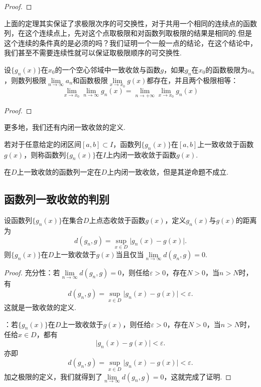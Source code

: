 \begin{proof}
    
\end{proof}

上面的定理其实保证了求极限次序的可交换性，对于共用一个相同的连续点的函数列，在这个连续点上，先对这个点取极限和对函数列取极限的结果是相同的.但是这个连续的条件真的是必须的吗？我们证明一个一般一点的结论，在这个结论中，我们甚至不需要连续性就可以保证取极限顺序的可交换性.

\begin{theorem}\label{thm:函数项级数:连续性定理}
    设\(\{g_n(x)\}\)在\(x_0\)的一个空心邻域中一致收敛与函数\(g\)，如果\(g_n\)在\(x_{0}\)的函数极限为\(a_n\)，则数列极限\(\lim\limits_{n\to\infty}a_n\)和函数极限\(\lim\limits_{x\to x_0}g(x)\)都存在，并且两个极限相等：\[\lim_{x\to x_0}\lim_{n\to \infty}g_{n}(x) = \lim_{n\to +\infty}\lim_{x\to x_0}g_{n}(x)\]
\end{theorem}
\begin{proof}
    
\end{proof}

更多地，我们还有{\heiti 内闭一致收敛}的定义.
\begin{definition}[内闭一致收敛]
    若对于任意给定的闭区间\([a,b]\subset I\)，函数列\(\{g_n(x)\}\)在\([a,b]\)上一致收敛于函数\(g(x)\)，则称函数列\(\{g_n(x)\}\)在\(I\)上{\heiti 内闭一致收敛}于函数\(g(x)\).
\end{definition}

在\(D\)上一致收敛的函数列一定在\(D\)上内闭一致收敛，但是其逆命题不成立.

\subsection{函数列一致收敛的判别}

    \begin{theorem}
        设函数列\(\{g_n(x)\}\)在集合\(D\)上点态收敛于函数\(g(x)\)，定义\(g_n(x)\)与\(g(x)\)的距离为\[d(g_n,g) =\sup_{x\in D}\lvert g_n(x) - g(x)\rvert.\]
        则\(\{g_n(x)\}\)在\(D\)上一致收敛于\(g(x)\)当且仅当\(\lim\limits_{n\to\infty}d(g_n,g) = 0\).
    \end{theorem}
    \begin{proof}
        {\heiti 充分性}：若\(\lim\limits_{n\to\infty}d(g_n,g) = 0\)，则任给\(\varepsilon>0\)，存在\(N>0\)，当\(n>N\)时，有\[d(g_n,g) = \sup_{x\in D}\lvert g_n(x) - g(x)\rvert<\varepsilon.\]这就是一致收敛的定义.

        ：若\(\{g_n(x)\}\)在\(D\)上一致收敛于\(g(x)\)，则任给\(\varepsilon>0\)，存在\(N>0\)，当\(n>N\)时，任给\(x\in D\)，都有\[\lvert g_n(x)-g(x)\rvert<\varepsilon.\]
        亦即\[d(g_n,g) =\sup_{x\in D}\lvert g_n(x) - g(x)\rvert<\varepsilon.\]
        加之极限的定义，我们就得到了\(\lim\limits_{n\to\infty}d(g_n,g) = 0\)，这就完成了证明.
    \end{proof}

